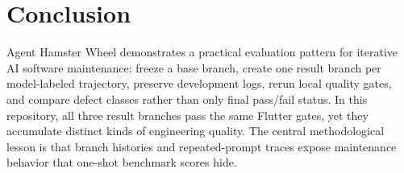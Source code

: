 \documentclass[11pt]{article}
\begin{document}
\section{Conclusion}
\label{sec:conclusion}

Agent Hamster Wheel demonstrates a practical evaluation pattern for iterative AI software maintenance: freeze a base branch, create one result branch per model-labeled trajectory, preserve development logs, rerun local quality gates, and compare defect classes rather than only final pass/fail status. In this repository, all three result branches pass the same Flutter gates, yet they accumulate distinct kinds of engineering quality. The central methodological lesson is that branch histories and repeated-prompt traces expose maintenance behavior that one-shot benchmark scores hide.



\end{document}
